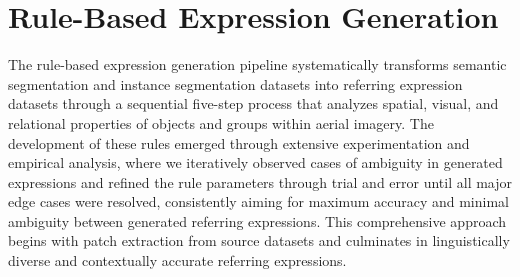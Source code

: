 \section{Rule-Based Expression Generation}

The rule-based expression generation pipeline systematically transforms semantic segmentation and instance segmentation datasets into referring expression datasets through a sequential five-step process that analyzes spatial, visual, and relational properties of objects and groups within aerial imagery. The development of these rules emerged through extensive experimentation and empirical analysis, where we iteratively observed cases of ambiguity in generated expressions and refined the rule parameters through trial and error until all major edge cases were resolved, consistently aiming for maximum accuracy and minimal ambiguity between generated referring expressions. This comprehensive approach begins with patch extraction from source datasets and culminates in linguistically diverse and contextually accurate referring expressions.

